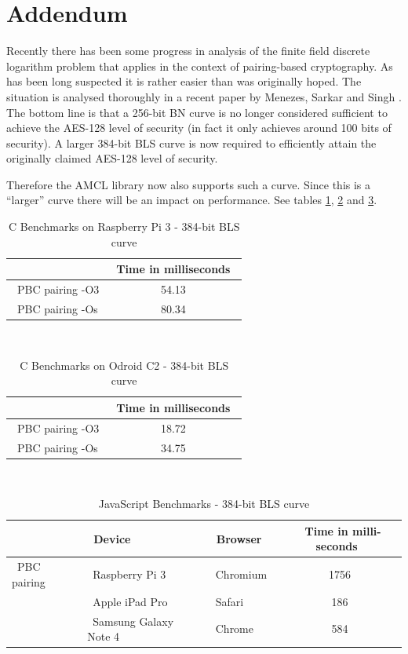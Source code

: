 \documentclass{llncs}
\begin{document}
\section*{Addendum}

Recently there has been some progress in analysis of the finite field discrete logarithm problem that applies in the context of pairing-based cryptography. As has been long suspected
it is rather easier than was originally hoped. The situation is analysed thoroughly in a recent paper by Menezes, Sarkar and Singh \cite{menezes}. The bottom line is that 
a 256-bit BN curve is no longer considered sufficient to achieve the AES-128 level of security (in fact it only achieves around 100 bits of security). A larger 384-bit BLS curve is now 
required to efficiently attain the originally claimed AES-128 level of security.

Therefore the AMCL library now also supports such a curve. Since this is a ``larger'' curve there will be an impact on performance. See tables \ref{cspeed32-2}, \ref{cspeed64-2} and \ref{jsspeed-2}.

\begin{table}
\centering
\begin{tabular}{|l|c|}
\hline
&~Time in milliseconds~\\
\hline
~PBC pairing -O3 & 54.13 \\ %
~PBC pairing -Os & 80.34 \\ %
\hline
\end{tabular}
~\\
\caption{C Benchmarks on Raspberry Pi 3 - 384-bit BLS curve}
\label{cspeed32-2}
\end{table}


\begin{table}
\centering
\begin{tabular}{|l|c|}
\hline
&~Time in milliseconds~\\
\hline
~PBC pairing -O3 & 18.72 \\ %
~PBC pairing -Os & 34.75 \\ %
\hline
\end{tabular}
~\\
\caption{C Benchmarks on Odroid C2 - 384-bit BLS curve}
\label{cspeed64-2}
\end{table}

\begin{table}
\centering
\begin{tabular}{|l|l|l|c|}
\hline
 & ~Device~ & ~Browser~ &~Time in milli-seconds~\\
\hline
~PBC pairing~  &  ~Raspberry Pi 3~ & ~Chromium~ & 1756\\
 &  ~Apple iPad Pro~ & ~Safari~ & 186\\
 &  ~Samsung Galaxy Note 4~ & ~Chrome~ & 584\\
\hline
\end{tabular}
~\\
\caption{JavaScript Benchmarks - 384-bit BLS curve}
\label{jsspeed-2}
\end{table}
\end{document}
